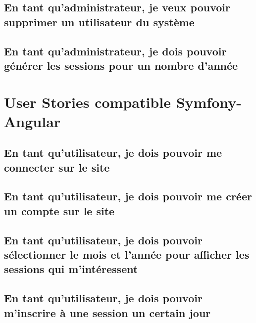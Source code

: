 	\vspace{\baselineskip}
	\vspace{\baselineskip}
	\subsection{En tant qu'administrateur, je veux pouvoir supprimer un utilisateur du système}
		
	
	\newpage
	\subsection{En tant qu'administrateur, je dois pouvoir générer les sessions pour un nombre d'année}
		

\newpage
\section{User Stories compatible Symfony-Angular}
	
	\subsection{En tant qu’utilisateur, je dois pouvoir me connecter sur le site}
		
	
	\newpage
	\subsection{En tant qu’utilisateur, je dois pouvoir me créer un compte sur le site}
		

	\vspace{\baselineskip}
	\subsection{En tant qu'utilisateur, je dois pouvoir sélectionner le mois et l'année pour afficher les sessions qui m'intéressent}
		
	
	\vspace{\baselineskip}
	\subsection{En tant qu’utilisateur, je dois pouvoir m’inscrire à une session un certain jour}
		

	\vspace{\baselineskip}
	\label{Inscription auto}
